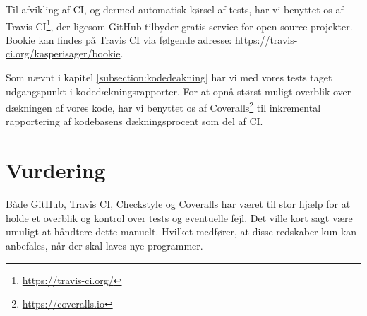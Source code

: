 Til afvikling af CI, og dermed automatisk kørsel af tests, har vi benyttet os af Travis CI\footnote{\url{https://travis-ci.org/}}, der ligesom GitHub tilbyder gratis service for open source projekter. Bookie kan findes på Travis CI via følgende adresse: \url{https://travis-ci.org/kasperisager/bookie}.

Som nævnt i kapitel \ref{subsection:kodedeakning} har vi med vores tests taget udgangspunkt i kodedækningsrapporter. For at opnå størst muligt overblik over dækningen af vores kode, har vi benyttet os af Coveralls\footnote{\url{https://coveralls.io}} til inkremental rapportering af kodebasens dækningsprocent som del af CI.

\section{Vurdering}

Både GitHub, Travis CI, Checkstyle og Coveralls har været til stor hjælp for at holde et overblik og kontrol over tests og eventuelle fejl. Det ville kort sagt være umuligt at håndtere dette manuelt. Hvilket medfører, at disse redskaber kun kan anbefales, når der skal laves nye programmer.





